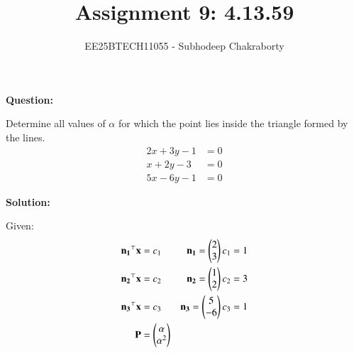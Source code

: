 \documentclass[journal,12pt,onecolumn]{IEEEtran}
\theoremstyle{remark}
\begin{document}

\vspace{3cm}

\title{Assignment 9: 4.13.59}
\author{EE25BTECH11055 - Subhodeep Chakraborty}
\maketitle
\hrulefill
\bigskip

\renewcommand{\thefigure}{\theenumi}
\renewcommand{\thetable}{\theenumi}

\textbf{Question:}\par
Determine all values of $\alpha$ for which the point  lies inside the triangle formed by the lines. \hfill{}
\begin{align}
 2x+3y-1&=0\\
 x+2y-3&=0\\
 5x-6y-1&=0
\end{align}
\par
\textbf{Solution:}\par

Given:
\begin{align}
 \mathbf{n_1}^\top\mathbf{x}&=c_1 &\mathbf{n_1}=\begin{pmatrix}2\\3\end{pmatrix} c_1 = 1 \\
 \mathbf{n_2}^\top\mathbf{x}&=c_2 &\mathbf{n_2}=\begin{pmatrix}1\\2\end{pmatrix} c_2 = 3 \\
 \mathbf{n_3}^\top\mathbf{x}&=c_3 &\mathbf{n_3}=\begin{pmatrix}5\\-6\end{pmatrix} c_3 = 1 \\
 \mathbf{P} &= \begin{pmatrix}\alpha \\ \alpha^2\end{pmatrix} &
\end{align}
\end{document}
